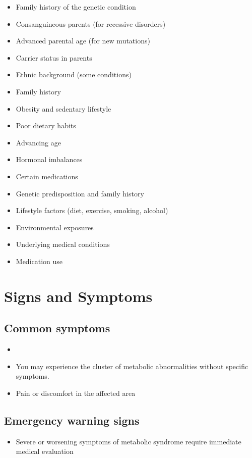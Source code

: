 \begin{itemize}[noitemsep]
  \item Family history of the genetic condition
  \item Consanguineous parents (for recessive disorders)
  \item Advanced parental age (for new mutations)
  \item Carrier status in parents
  \item Ethnic background (some conditions)
  \item Family history
  \item Obesity and sedentary lifestyle
  \item Poor dietary habits
  \item Advancing age
  \item Hormonal imbalances
  \item Certain medications
  \item Genetic predisposition and family history
  \item Lifestyle factors (diet, exercise, smoking, alcohol)
  \item Environmental exposures
  \item Underlying medical conditions
  \item Medication use
\end{itemize}
\section{Signs and Symptoms}

\subsection{Common symptoms}
\begin{itemize}[noitemsep]
  \item \item You may experience the cluster of metabolic abnormalities without specific symptoms.

  \item Pain or discomfort in the affected area
  \end{itemize}

\subsection{Emergency warning signs}
\begin{itemize}[noitemsep]
  \item Severe or worsening symptoms of metabolic syndrome require immediate medical evaluation
\end{itemize}
